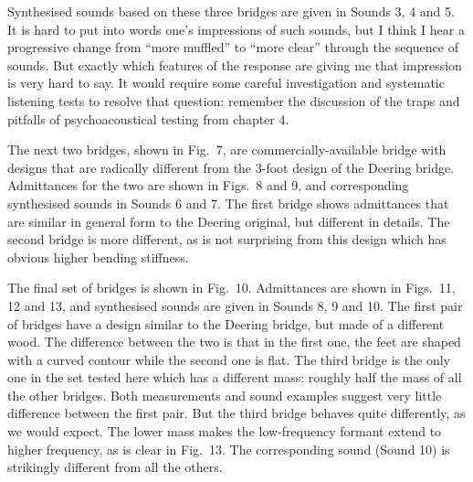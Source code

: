   Synthesised sounds based on these three bridges are given in Sounds 3, 4 and 
  5. It is hard to put into words one's impressions of such sounds, but I think 
  I hear a progressive change from ``more muffled'' to ``more clear'' through 
  the sequence of sounds. But exactly which features of the response are giving 
  me that impression is very hard to say. It would require some careful 
  investigation and systematic listening tests to resolve that question: 
  remember the discussion of the traps and pitfalls of psychoacoustical testing 
  from chapter 4. 

  The next two bridges, shown in Fig.\ 7, are commercially-available bridge 
  with designs that are radically different from the 3-foot design of the 
  Deering bridge. Admittances for the two are shown in Figs.\ 8 and 9, and 
  corresponding synthesised sounds in Sounds 6 and 7. The first bridge shows 
  admittances that are similar in general form to the Deering original, but 
  different in details. The second bridge is more different, as is not 
  surprising from this design which has obvious higher bending stiffness. 

  The final set of bridges is shown in Fig.\ 10. Admittances are shown in 
  Figs.\ 11, 12 and 13, and synthesised sounds are given in Sounds 8, 9 and 10. 
  The first pair of bridges have a design similar to the Deering bridge, but 
  made of a different wood. The difference between the two is that in the first 
  one, the feet are shaped with a curved contour while the second one is flat. 
  The third bridge is the only one in the set tested here which has a different 
  mass: roughly half the mass of all the other bridges. Both measurements and 
  sound examples suggest very little difference between the first pair. But the 
  third bridge behaves quite differently, as we would expect. The lower mass 
  makes the low-frequency formant extend to higher frequency, as is clear in 
  Fig.\ 13. The corresponding sound (Sound 10) is strikingly different from all 
  the others. 